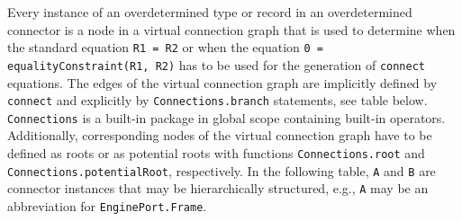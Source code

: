 Every instance of an overdetermined type or record in an overdetermined
connector is a node in a virtual connection graph that is used to
determine when the standard equation \lstinline!R1 = R2! or when the equation
\lstinline!0 = equalityConstraint(R1, R2)! has to be used for the generation of
\lstinline!connect! equations. The edges of the virtual connection graph are
implicitly defined by \lstinline!connect! and explicitly by
\lstinline!Connections.branch! statements, see table below. \lstinline!Connections! is a
built-in package in global scope containing built-in operators.
Additionally, corresponding nodes of the virtual connection graph have
to be defined as roots or as potential roots with functions
\lstinline!Connections.root! and \lstinline!Connections.potentialRoot!, respectively.
In the following table, \lstinline!A! and \lstinline!B! are connector instances that may be
hierarchically structured, e.g., \lstinline!A! may be an abbreviation for
\lstinline!EnginePort.Frame!.

